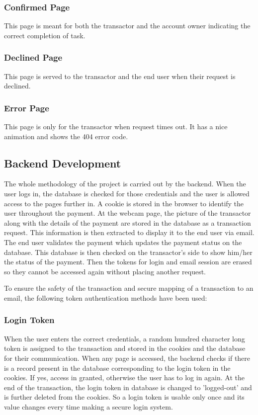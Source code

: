 \documentclass[12pt, oneside, a4paper]{article}
\begin{document}
\subsubsection{Confirmed Page}
This page is meant for both the transactor and the account owner indicating the correct completion of task.

\subsubsection{Declined Page}
This page is served to the transactor and the end user when their request is declined.

\subsubsection{Error Page}
This page is only for the transactor when request times out. It has a nice animation and shows the 404 error code.

\subsection{Backend Development}
\vspace{0.5cm}
The whole methodology of the project is carried out by the backend. When the user logs in, the database is checked for those credentials and the user is allowed access to the pages further in. A cookie is stored in the browser to identify the user throughout the payment. At the webcam page, the picture of the transactor along with the details of the payment are stored in the database as a transaction request. This information is then extracted to display it to the end user via email. The end user validates the payment which updates the payment status on the database. This database is then checked on the transactor's side to show him/her the status of the payment. Then the tokens for login and email session are erased so they cannot be accessed again without placing another request.

To ensure the safety of the transaction and secure mapping of a transaction to an email, the following token authentication methods have been used:

\subsubsection{Login Token}
When the user enters the correct credentials, a random hundred character long token is assigned to the transaction and stored in the cookies and the database for their communication. When any page is accessed, the backend checks if there is a record present in the database corresponding to the login token in the cookies. If yes, access in granted, otherwise the user has to log in again. At the end of the transaction, the login token in database is changed to 'logged-out' and is further deleted from the cookies. So a login token is usable only once and its value changes every time making a secure login system.
\end{document}
